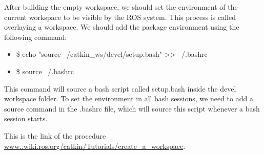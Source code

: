  After building the empty workspace, we should set the environment of the current workspace to be visible by the ROS system.
 This process is called overlaying a workspace. We should add the package environment using the following command:
 \begin{itemize}
 	\item \$ echo "source ~/catkin\_ws/devel/setup.bash" >> ~/.bashrc 
 	\item \$ source ~/.bashrc
 \end{itemize}
 This command will source a bash script called setup.bash inside the devel workspace folder. To set the environment in all bash sessions, we need to add a source command in the .bashrc file, which will source this script whenever a bash session starts.
 
 This is the link of the procedure \url{www..wiki.ros.org/catkin/Tutorials/create\_a\_workspace}.
 
